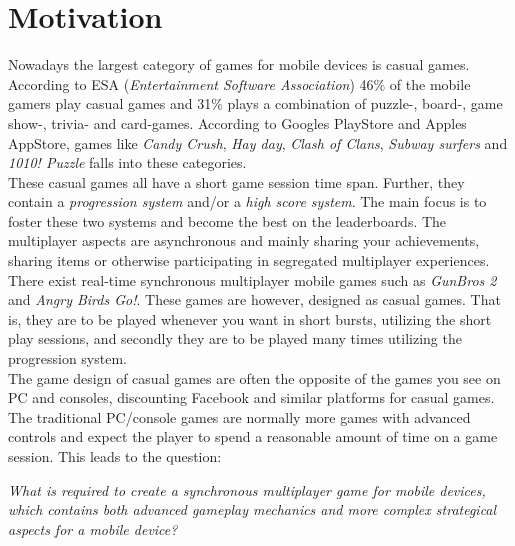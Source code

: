 \section{Motivation} \label{sec:motivation}
Nowadays the largest category of games for mobile devices is casual games. According to ESA\cite{ESA}\cite{ESApdf} (\textit{Entertainment Software Association}) 46\% of the mobile gamers play casual games and 31\% plays a combination of puzzle-, board-, game show-, trivia- and card-games. 
According to Googles PlayStore \cite{googleplay} and Apples AppStore\cite{appstore}, games like \textit{Candy Crush}, \textit{Hay day}, \textit{Clash of Clans}, \textit{Subway surfers} and \textit{1010! Puzzle} falls into these categories.\\

These casual games all have a short game session time span. Further, they contain a \textit{progression system} and/or a \textit{high score system}. The main focus is to foster these two systems and become the best on the leaderboards. The multiplayer aspects are asynchronous and mainly sharing your achievements, sharing items or otherwise participating in segregated multiplayer experiences.\\

There exist real-time synchronous multiplayer mobile games such as \textit{GunBros 2} and \textit{Angry Birds Go!}. These games are however, designed as casual games. That is, they are to be played whenever you want in short bursts, utilizing the short play sessions, and secondly they are to be played many times utilizing the progression system.\\

The game design of casual games are often the opposite of the games you see on PC and consoles, discounting Facebook and similar platforms for casual games. The traditional PC/console games are normally more games with advanced controls and expect the player to spend a reasonable amount of time on a game session. This leads to the question:
\begin{center}
\textit{What is required to create a synchronous multiplayer game for mobile devices, which contains both advanced gameplay mechanics and more complex strategical aspects for a mobile device?}
\end{center}


